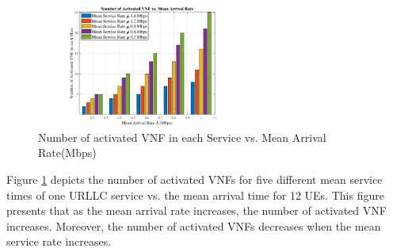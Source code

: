 \documentclass[lettersize,journal]{IEEEtran}
\begin{document}
\begin{figure}
\centering
  \captionsetup{justification=centering}
       \includegraphics[width=7cm,height=4cm]{vnfNum1.eps}
  \caption{Number of activated VNF in each Service vs. Mean Arrival Rate(Mbps)}
  \label{fig:4}
\end{figure}
Figure \ref{fig:4} depicts the number of activated VNFs for five different mean service times of one URLLC service vs. the mean arrival time for 12 UEs. This figure presents that as the mean arrival rate increases, the number of activated VNF increases. Moreover, the number of activated VNFs decreases when the mean service rate increases.
\end{document}
